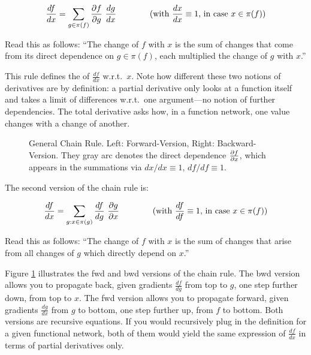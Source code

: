 \begin{Identities}
 \begin{equation}
\frac{df}{dx} = \sum_{g\in\pi(f)} \frac{\partial f}{\partial g}~ \frac{dg}{dx}
  \qquad\qquad \text{(with $\frac{dx}{dx}\equiv 1$, in case $x\in\pi(f)$)}
\end{equation}
\end{Identities}
Read this as follows: ``The change of $f$ with $x$ is the sum of changes that come from its direct dependence on $g\in\pi(f)$, each multiplied the change of $g$ with $x$.''

This rule defines the  of $\frac{df}{dx}$ w.r.t.\
$x$. Note how different these two notions of derivatives are by
definition: a partial derivative only looks at a function itself and takes a
limit of differences w.r.t.\ one argument---no notion of further
dependencies. The total derivative asks how, in a function network,
one value changes with a change of another.

\begin{figure}
\caption{\label{figChainRule}
General Chain Rule. Left: Forward-Version, Right:
Backward-Version. They gray arc denotes the direct dependence
$\frac{\partial f}{\partial x}$, which appears in the summations via $dx/dx \equiv 1$, $df/df \equiv 1$.}
\end{figure}

The second version of the chain rule is:
\begin{Identities}
\begin{equation}
\frac{df}{dx} = \sum_{g:x\in\pi(g)} \frac{d f}{d g}~ \frac{\partial g}{\partial x}
  \qquad\qquad \text{(with $\frac{df}{df}\equiv 1$, in case $x\in\pi(f)$)}
\end{equation}
\end{Identities}
Read this as follows: ``The change of $f$ with $x$ is the sum of changes that arise from all changes of $g$ which directly depend on $x$.''

Figure \ref{figChainRule} illustrates the fwd and bwd versions of the
chain rule. The bwd version allows you to propagate back, given
gradients $\frac{d f}{d g}$ from top to $g$, one step further down,
from top to $x$. The fwd version allows you to propagate forward,
given gradients $\frac{d g}{d x}$ from $g$ to bottom, one step further
up, from $f$ to bottom. Both versions are recursive equations. If you
would recursively plug in the definition for a given functional network,
both of them would yield the same expression of $\frac{df}{dx}$ in
terms of partial derivatives only.

